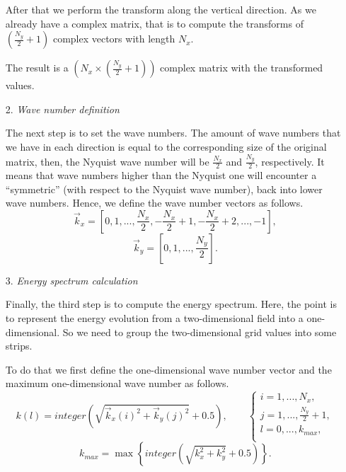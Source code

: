 \begin{itemize}
After that we perform the transform along the vertical direction. As we already have a complex matrix, that is to compute the transforms of $\left(\frac{N_y}{2}+1\right)$ complex vectors with length $N_x$.

The result is a $\left(N_x\times\left(\frac{N_y}{2}+1\right)\right)$ complex matrix with the transformed values.

\item[2.]\textit{Wave number definition}

The next step is to set the wave numbers. The amount of wave numbers that we have in each direction is equal to the corresponding size of the original matrix, then, the Nyquist wave number will be $\frac{N_x}{2}$ and $\frac{N_y}{2}$, respectively. It means that wave numbers higher than the Nyquist one will encounter a ``symmetric'' (with respect to the Nyquist wave number), back into lower wave numbers. Hence, we define the wave number vectors as follows.
\begin{equation*}
\label{1.12.3}
\vec{k}_x=\left[0,1,...,\frac{N_x}{2},-\frac{N_x}{2}+1,-\frac{N_x}{2}+2,...,-1\right],
\end{equation*}
\begin{equation*}
\label{1.12.4}
\vec{k}_y=\left[0,1,...,\frac{N_y}{2}\right].
\end{equation*}

\item[3.]\textit{Energy spectrum calculation}

Finally, the third step is to compute the energy spectrum. Here, the point is to represent the energy evolution from a two-dimensional field into a one-dimensional. So we need to group the two-dimensional grid values into some strips.

To do that we first define the one-dimensional wave number vector and the maximum one-dimensional wave number as follows.
\begin{equation*}
\label{1.12.5}
k(l)=integer\left(\sqrt{\vec{k}_x(i)^2+\vec{k}_y(j)^2}+0.5\right),\quad\quad\left\{\begin{array}{l}
i=1,...,N_x,\\
j=1,...,\frac{N_y}{2}+1,\\
l=0,...,k_{max},\\
\end{array} \right.
\end{equation*}
\begin{equation*}
\label{1.12.6}
k_{max}=\max\left\{integer\left(\sqrt{k_x^2+k_y^2}+0.5\right)\right\}.
\end{equation*}


\end{itemize}
